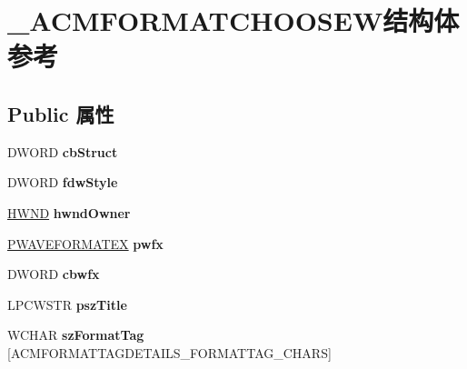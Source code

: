 \hypertarget{struct___a_c_m_f_o_r_m_a_t_c_h_o_o_s_e_w}{}\section{\+\_\+\+A\+C\+M\+F\+O\+R\+M\+A\+T\+C\+H\+O\+O\+S\+E\+W结构体 参考}
\label{struct___a_c_m_f_o_r_m_a_t_c_h_o_o_s_e_w}
\subsection*{Public 属性}
\begin{DoxyCompactItemize}
\item 
\mbox{\label{struct___a_c_m_f_o_r_m_a_t_c_h_o_o_s_e_w_a9472d42c38e1030d02f5018222f748f2}} 
D\+W\+O\+RD {\bfseries cb\+Struct}
\item 
\mbox{\label{struct___a_c_m_f_o_r_m_a_t_c_h_o_o_s_e_w_accad8cd672675a4a2676288bc280ca2a}} 
D\+W\+O\+RD {\bfseries fdw\+Style}
\item 
\mbox{\label{struct___a_c_m_f_o_r_m_a_t_c_h_o_o_s_e_w_a248fcc64e05018c20bf83d7c3fe69a2d}} 
\hyperlink{interfacevoid}{H\+W\+ND} {\bfseries hwnd\+Owner}
\item 
\mbox{\label{struct___a_c_m_f_o_r_m_a_t_c_h_o_o_s_e_w_adb0a20a9404c8aaff64f807ec73c3a89}} 
\hyperlink{struct___w_a_v_e_f_o_r_m_a_t_e_x}{P\+W\+A\+V\+E\+F\+O\+R\+M\+A\+T\+EX} {\bfseries pwfx}
\item 
\mbox{\label{struct___a_c_m_f_o_r_m_a_t_c_h_o_o_s_e_w_a60dd40197ddd48cc8d41c3116b7fb8d6}} 
D\+W\+O\+RD {\bfseries cbwfx}
\item 
\mbox{\label{struct___a_c_m_f_o_r_m_a_t_c_h_o_o_s_e_w_a9c9f49f84c43d28669166039addcb252}} 
L\+P\+C\+W\+S\+TR {\bfseries psz\+Title}
\item 
\mbox{\label{struct___a_c_m_f_o_r_m_a_t_c_h_o_o_s_e_w_a81312bc557f3136afa7f519ec6bed229}} 
W\+C\+H\+AR {\bfseries sz\+Format\+Tag} \mbox{[}A\+C\+M\+F\+O\+R\+M\+A\+T\+T\+A\+G\+D\+E\+T\+A\+I\+L\+S\+\_\+\+F\+O\+R\+M\+A\+T\+T\+A\+G\+\_\+\+C\+H\+A\+RS\mbox{]}

\end{DoxyCompactItemize}
